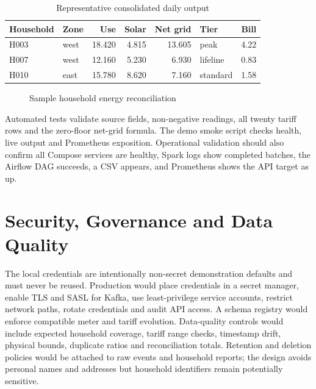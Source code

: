 \documentclass[11pt,a4paper]{article}
\begin{document}
\begin{table}[H]\centering\small
\caption{Representative consolidated daily output}
\begin{tabular}{l l r r r l r}\toprule Household & Zone & Use & Solar & Net grid & Tier & Bill \\\midrule
H003 & west & 18.420 & 4.815 & 13.605 & peak & 4.22\\
H007 & west & 12.160 & 5.230 & 6.930 & lifeline & 0.83\\
H010 & east & 15.780 & 8.620 & 7.160 & standard & 1.58\\\bottomrule
\end{tabular}\end{table}

\begin{figure}[H]\centering
{}
\caption{Sample household energy reconciliation}
\end{figure}

Automated tests validate source fields, non-negative readings, all twenty tariff rows and the zero-floor net-grid formula. The demo smoke script checks health, live output and Prometheus exposition. Operational validation should also confirm all Compose services are healthy, Spark logs show completed batches, the Airflow DAG succeeds, a CSV appears, and Prometheus shows the API target as up.

\section{Security, Governance and Data Quality}
The local credentials are intentionally non-secret demonstration defaults and must never be reused. Production would place credentials in a secret manager, enable TLS and SASL for Kafka, use least-privilege service accounts, restrict network paths, rotate credentials and audit API access. A schema registry would enforce compatible meter and tariff evolution. Data-quality controls would include expected household coverage, tariff range checks, timestamp drift, physical bounds, duplicate ratios and reconciliation totals. Retention and deletion policies would be attached to raw events and household reports; the design avoids personal names and addresses but household identifiers remain potentially sensitive.
\end{document}
